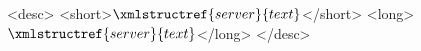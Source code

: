 <desc>
  <short>$\xmlstructref{server}{text}$</short>
  <long>$\xmlstructref{server}{text}$</long>  
</desc>
